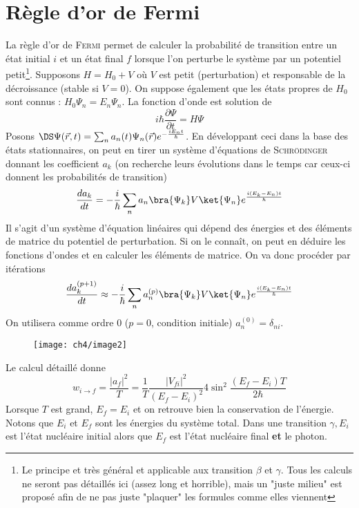 \section{Règle d'or de Fermi}
La règle d'or de \textsc{Fermi} permet de calculer la probabilité de transition entre un état initial $i$ et 
un état final $f$ lorsque l'on perturbe le système par un potentiel petit\footnote{Le principe et très général
et applicable aux transition $\beta$ et $\gamma$. Tous les calculs ne seront pas détaillés ici (assez long et
horrible), mais un "juste milieu" est proposé afin de ne pas juste "plaquer" les formules comme elles viennent}.
Supposons $H=H_0+V$ où $V$ est petit (perturbation) et responsable de la décroissance (stable si $V=0$). On 
suppose également que les états propres de $H_0$ sont connus : $H_0\Psi_n=E_n\Psi_n$. La fonction d'onde est 
solution de 
\begin{equation}
i\hbar\dfrac{\partial\Psi}{\partial t} = H\Psi
\end{equation}
Posons $\DS \Psi(\vec{r},t) = \sum_n a_n(t)\Psi_n(\vec{r})e^{-\frac{iE_nt}{\hbar}}$. En développant ceci
dans la base des états stationnaires, on peut en tirer un système d'équations de \textsc{Schrödinger} donnant
les coefficient $a_k$ (on recherche leurs évolutions dans le temps car ceux-ci donnent les probabilités de
transition)
\begin{equation}
\frac{da_k}{dt} = -\frac{i}{\hbar}\sum_{n}a_n \bra{\Psi_k}V\ket{\Psi_n}e^{\frac{i(E_k-E_n)t}{\hbar}}
\end{equation}
Il s'agit d'un système d'équation linéaires qui dépend des énergies et des éléments de matrice du potentiel
de perturbation. Si on le connaît, on peut en déduire les fonctions d'ondes et en calculer les éléments de
matrice. On va donc procéder par itérations
\begin{equation}
\dfrac{da_k^{(p+1)}}{dt}\approx -\frac{i}{\hbar}\sum_n a_n^ {(p)}
\bra{\Psi_k}V\ket{\Psi_n}e^{\frac{i(E_k-E_n)t}{\hbar}}
\end{equation}
On utilisera comme ordre 0 ($p=0$, condition initiale) $a_n^{(0)} = \delta_{ni}$.\\

	\begin{wrapfigure}[11]{r}{5cm}
	\vspace{-7mm}
	\texttt{[image: ch4/image2]}
	\end{wrapfigure}

Le calcul détaillé donne
\begin{equation}
w_{i\to f} = \dfrac{|a_f|^2}{T}=\frac{1}{T}\dfrac{|V_{fi}|^2}{(E_f-E_i)^2}4\sin^2\frac{(E_f-E_i)T}{2\hbar}
\end{equation}
Lorsque $T$ est grand, $E_f=E_i$ et on retrouve bien la conservation de l'énergie. Notons que $E_i$ et $E_f$ 
sont les énergies du système total. Dans une transition $\gamma, E_i$ est l'état nucléaire initial alors
que $E_f$ est l'état nucléaire final \textbf{et} le photon.\\

